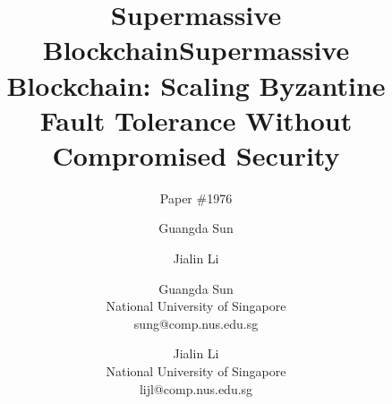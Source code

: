 \ifarxiv
\newcommand{\sys}{Supermassive Blockchain\xspace}
\title{\sys}
\else
\newcommand{\sys}{\textsc{BigBFT}\xspace}
\title{\sys: Scaling Byzantine Fault Tolerance Without Compromised Security}
\fi

\ifreview
\author{Paper \#1976}
\else
\ifacm
\author{Guangda Sun}
\author{Jialin Li}
\else
\author{
{\rm Guangda Sun}\\
National University of Singapore\\
sung@comp.nus.edu.sg
\and
{\rm Jialin Li}\\
National University of Singapore\\
lijl@comp.nus.edu.sg
}
\fi
\fi

\ifacm
\acmDOI{}
\acmISBN{}
\fi

\ifacm
\else
\titlespacing*{\paragraph}{0pt}{0pt}{1em}
\fi

\newcommand{\eg}{e.g.\@\xspace}
\newcommand{\ie}{i.e.\@\xspace}

\newcommand{\yes}{\textcolor{green}{\ding{51}}}
\newcommand{\no}{\textcolor{red}{\ding{55}}}

\newcommand{\fetch}{\texttt{fetch}\xspace}
\newcommand{\bump}{\texttt{post}\xspace}
\newcommand{\forward}{\texttt{skip}\xspace}

\newcommand{\votec}{\textsc{VoteCheckpoint}\xspace}
\newcommand{\retrieve}{\textsc{Retrieve}\xspace}
\newcommand{\retrieves}{\textsc{RetrieveShard}\xspace}
\newcommand{\pushss}{\textsc{StoreShard}\xspace}
\newcommand{\voter}{\textsc{VoteReconfig}\xspace}
\newcommand{\getsc}{\textsc{RetrieveChunk}\xspace}

\newcommand{\code}[1]{\texttt{#1}\xspace}
